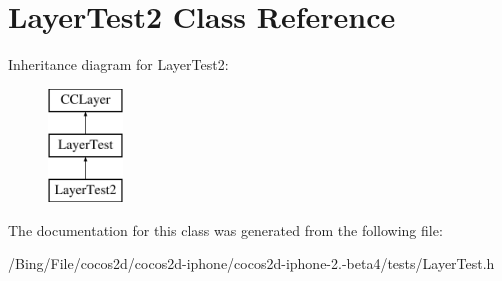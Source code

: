 \hypertarget{interface_layer_test2}{\section{Layer\-Test2 Class Reference}
\label{interface_layer_test2}
}
Inheritance diagram for Layer\-Test2\-:\begin{figure}[H]
\begin{center}
\leavevmode
\includegraphics[height=3.000000cm]{interface_layer_test2}
\end{center}
\end{figure}


The documentation for this class was generated from the following file\-:\begin{DoxyCompactItemize}
\item 
/\-Bing/\-File/cocos2d/cocos2d-\/iphone/cocos2d-\/iphone-\/2.-\/beta4/tests/Layer\-Test.\-h\end{DoxyCompactItemize}
